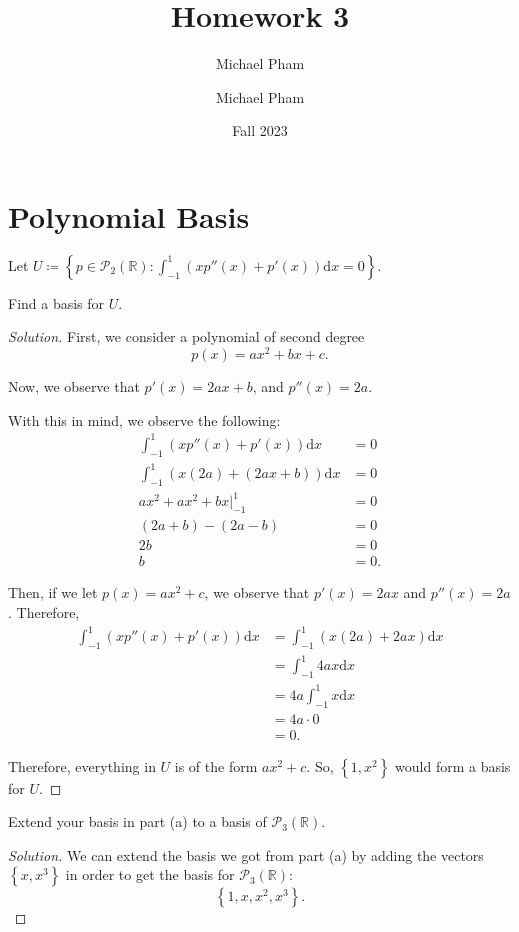 \documentclass{article}
\title{#1}
\author{Michael Pham}
\date{#2}
\newenvironment{solution}{\begin{proof}[Solution]}{\end{proof}}
\newcommand{\RR}{\mathbb{R}}
\newcommand{\mytitle}[2]{%
	\title{#1}
	\author{Michael Pham}
	\date{#2}
	\maketitle
	\newpage
	\tableofcontents
	\newpage
}
\begin{document}
	\mytitle{Homework 3}{Fall 2023}
	
	\section{Polynomial Basis}
	Let $U \coloneq \left\{  p \in \mathscr{P}_{2}(\RR) : \int_{-1}^{1} (xp''(x) + p'(x)) \mathrm{d}x = 0 \right\}$.
	\begin{hw}
		Find a basis for $U$.
	\end{hw}
	\begin{solution}
		First, we consider a polynomial of second degree
		\begin{equation*}
			p(x) = ax^{2} + bx + c.
		\end{equation*}
	
		Now, we observe that $p'(x) = 2ax + b$, and $p''(x) = 2a$.
		
		With this in mind, we observe the following:
		\begin{align*}
			\int_{-1}^{1} (xp''(x) + p'(x)) \mathrm{d}x &= 0 \\
			\int_{-1}^{1} (x(2a) + (2ax+b)) \mathrm{d}x &= 0 \\
			ax^{2} + ax^{2} + bx \Big|_{-1}^{1} &= 0 \\
			(2a + b) - (2a - b) &= 0 \\
			2b &= 0 \\
			b &= 0.
		\end{align*}
	
		Then, if we let $p(x) = ax^{2} + c$, we observe that $p'(x) = 2ax$ and $p''(x) = 2a$. Therefore,
		\begin{align*}
			\int_{-1}^{1} (xp''(x) + p'(x)) \mathrm{d}x &= \int_{-1}^{1} (x(2a) + 2ax) \mathrm{d}x \\
			&= \int_{-1}^{1} 4ax \mathrm{d}x \\
			&= 4a \int_{-1}^{1} x \mathrm{d}x \\
			&= 4a \cdot 0 \\
			&= 0.
		\end{align*}
	
		Therefore, everything in $U$ is of the form $ax^{2} + c$. So, $\left\{  1, x^{2}\right\}$ would form a basis for $U$.
	\end{solution}

	\begin{hw}
		Extend your basis in part (a) to a basis of $\mathscr{P}_{3}(\RR)$.
	\end{hw}
	\begin{solution}
		We can extend the basis we got from part (a) by adding the vectors $\left\{  x, x^{3}\right\}$ in order to get the basis for $\mathscr{P}_{3}(\RR)$:
		\begin{equation*}
			\left\{  1, x, x^{2}, x^{3} \right\}.
		\end{equation*}
	\end{solution}
		
\end{document}
